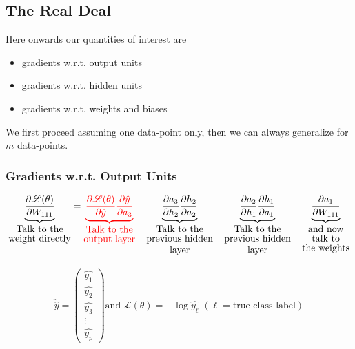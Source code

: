 \documentclass[11pt, a4paper]{article}
\begin{document}
\subsection{The Real Deal}

Here onwards our quantities of interest are

\begin{itemize}

\item gradients w.r.t. output units

\item gradients w.r.t. hidden units

\item gradients w.r.t. weights and biases

\end{itemize}

We first proceed assuming one data-point only, then we can always generalize for $m$ data-points.

\subsubsection{Gradients w.r.t. Output Units}

\vspace{0.3cm}

$$\underbrace{\dfrac{\partial \mathscr{L}(\theta)}{\partial W_{111}}}_{\shortstack{Talk to the\\weight directly}}
=
\textcolor{red}{\underbrace{\dfrac{\partial \mathscr{L}(\theta)}{\partial \hat{y}} \dfrac{\partial \hat{y}}{\partial a_3}}_{\shortstack{Talk to the\\output layer}}} \,\,\,\,\,\,
\underbrace{\dfrac{\partial a_3}{\partial h_2} \dfrac{\partial h_2}{\partial a_2}}_{\shortstack{Talk to the\\previous hidden\\layer}} \,\,\,\,\,\,
\underbrace{\dfrac{\partial a_2}{\partial h_1} \dfrac{\partial h_1}{\partial a_1}}_{\shortstack{Talk to the\\previous hidden\\layer}} \,\,\,\,\,\,
\underbrace{\dfrac{\partial a_1}{\partial W_{111}}}_{\shortstack{and now\\talk to\\the weights}}$$

\begin{gather*}
\utilde{\hat{y}} = 
\begin{pmatrix}
\hat{y_1} \\ \hat{y_2} \\ \hat{y_3} \\ \vdots \\ \hat{y_p}
\end{pmatrix}
\text{and }
\mathscr{L}(\theta) = - \log \hat{y_\ell} \,\, (\ell = \text{true class label})
\end{gather*}
\end{document}
